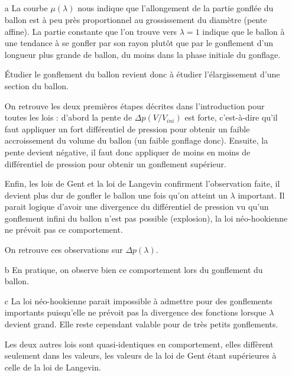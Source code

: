 \documentclass[a4paper,11pt]{article}
\begin{document}
\subsection{}
\begin{enumerate}
\item[a]
La courbe $\mu(\lambda)$ nous indique que l'allongement de la partie gonflée du ballon est à peu près proportionnel au grossissement du diamètre (pente affine). La partie constante que l'on trouve vers $\lambda = 1$ indique que le ballon à une tendance à se gonfler par son rayon plutôt que par le gonflement d'un longueur plus grande de ballon, du moins dans la phase initiale du gonflage.

\hspace{0.8cm} Étudier le gonflement du ballon revient donc à étudier l'élargissement d'une section du ballon.

\hspace{0.8cm} On retrouve les deux premières étapes décrites dans l'introduction pour toutes les lois : d'abord la pente de $\Delta p (V/V_{ini})$ est forte, c'est-à-dire qu'il faut appliquer un fort différentiel de pression pour obtenir un faible accroissement du volume du ballon (un faible gonflage donc). Ensuite, la pente devient négative, il faut donc appliquer de moins en moins de différentiel de pression pour obtenir un gonflement supérieur.

\hspace{0.8cm}Enfin, les lois de Gent et la loi de Langevin confirment l'observation faite, il devient plus dur de gonfler le ballon une fois qu'on atteint un $\lambda$ important. Il parait logique d'avoir une divergence du différentiel de pression vu qu'un gonflement infini du ballon n'est pas possible (explosion), la loi néo-hookienne ne prévoit pas ce comportement.

On retrouve ces observations sur $\Delta p (\lambda)$.

\item[b]
En pratique, on observe bien ce comportement lors du gonflement du ballon.

\item[c]
La loi néo-hookienne parait impossible à admettre pour des gonflements importants puisqu'elle ne prévoit pas la divergence des fonctions lorsque $\lambda$ devient grand. Elle reste cependant valable pour de très petits gonflements.

\hspace{0.8cm}Les deux autres lois sont quasi-identiques en comportement, elles diffèrent seulement dans les valeurs, les valeurs de la loi de Gent étant supérieures à celle de la loi de Langevin.


\end{enumerate}
\end{document}
